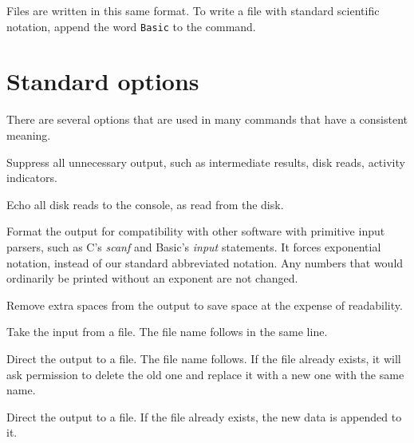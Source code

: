 Files are written in this same format.  To write a file with standard
scientific notation, append the word {\tt Basic} to the command.
\section{Standard options}

There are several options that are used in many commands that have a
consistent meaning.

\begin{description}

\item[{\tt Quiet}] Suppress all unnecessary output, such as intermediate
results, disk reads, activity indicators.

\item[{\tt Echo}] Echo all disk reads to the console, as read from the disk.

\item[{\tt Basic}] Format the output for compatibility with other software
with primitive input parsers, such as C's {\em scanf} and Basic's {\em input}
statements.  It forces exponential notation, instead of our standard
abbreviated notation.  Any numbers that would ordinarily be printed without
an exponent are not changed.

\item[{\tt Pack}] Remove extra spaces from the output to save space at the 
expense of readability.

\item[{\tt <}] Take the input from a file.  The file name follows in the
same line.

\item[{\tt >}] Direct the output to a file.  The file name follows.  If the
file already exists, it will ask permission to delete the old one and
replace it with a new one with the same name.

\item[{\tt >>}] Direct the output to a file.  If the file already exists,
the new data is appended to it.  

\end{description}

